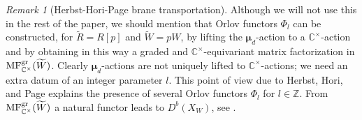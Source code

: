 \documentclass[11pt]{amsart}
\theoremstyle{definition} %
\theoremstyle{remark} %
\newtheorem{rem}[thm]{Remark}%
\newcommand{\CC}{\mathbb C}
\newcommand{\ZZ}{\mathbb Z}
\def\MFhom{\operatorname{{MF}}}
\def\wt{\widetilde}
\newcommand{\bmu}{\boldsymbol{\mu}}
\newcommand{\tW}{\widetilde{W}}
\begin{document}
\begin{rem}[Herbst-Hori-Page brane transportation] 
\label{rem:branetrans} 
Although we will not use this in the rest of the paper, 
we should mention that 
Orlov functors $\Phi_l$ can be constructed, 
for $\wt R=R[p]$ and $\tW=pW$, 
by lifting the $\bmu_d$-action to a $\CC^\times$-action and 
by obtaining in this way 
a graded and $\CC^\times$-equivariant matrix factorization in 
$\MFhom^{\rm gr}_{\CC^\times}(\tW)$.
Clearly $\bmu_d$-actions are not uniquely lifted to 
$\CC^\times$-actions; we need an extra datum of  
an integer parameter $l$. 
This point of view due to Herbst, Hori, and Page
explains the presence of several Orlov functors 
$\Phi_l$ for $l\in \ZZ$. 
From $\MFhom^{\rm gr}_{\CC^\times}(\tW)$
a natural functor leads to $D^b(X_W)$, 
see \cite{HHP}.
\end{rem}
\end{document}
